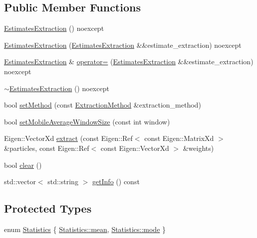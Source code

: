 \subsection*{Public Member Functions}
\begin{DoxyCompactItemize}
\item 
\mbox{\hyperlink{classbfl_1_1EstimatesExtraction_a49ab15a22c1766a16cd6ccc29447dd49}{Estimates\+Extraction}} () noexcept
\item 
\mbox{\hyperlink{classbfl_1_1EstimatesExtraction_a3d16bdd9dbc8841eae07cfdc3aa52114}{Estimates\+Extraction}} (\mbox{\hyperlink{classbfl_1_1EstimatesExtraction}{Estimates\+Extraction}} \&\&estimate\+\_\+extraction) noexcept
\item 
\mbox{\hyperlink{classbfl_1_1EstimatesExtraction}{Estimates\+Extraction}} \& \mbox{\hyperlink{classbfl_1_1EstimatesExtraction_ae473904953c7ad90408da2b4d3c14a1a}{operator=}} (\mbox{\hyperlink{classbfl_1_1EstimatesExtraction}{Estimates\+Extraction}} \&\&estimate\+\_\+extraction) noexcept
\item 
\mbox{\hyperlink{classbfl_1_1EstimatesExtraction_af7a89d920cc8e4ebbef66c1dfce37ecb}{$\sim$\+Estimates\+Extraction}} () noexcept
\item 
bool \mbox{\hyperlink{classbfl_1_1EstimatesExtraction_a68bb4f3b41f578a38d9847b9c140c130}{set\+Method}} (const \mbox{\hyperlink{classbfl_1_1EstimatesExtraction_a8489976af4025f0bbc3288ff7f17ffb0}{Extraction\+Method}} \&extraction\+\_\+method)
\item 
bool \mbox{\hyperlink{classbfl_1_1EstimatesExtraction_a49babb0803c50d697b8d21014010f5bb}{set\+Mobile\+Average\+Window\+Size}} (const int window)
\item 
Eigen\+::\+Vector\+Xd \mbox{\hyperlink{classbfl_1_1EstimatesExtraction_aeb792e7d2e162c13f66903551ff82dfa}{extract}} (const Eigen\+::\+Ref$<$ const Eigen\+::\+Matrix\+Xd $>$ \&particles, const Eigen\+::\+Ref$<$ const Eigen\+::\+Vector\+Xd $>$ \&weights)
\item 
bool \mbox{\hyperlink{classbfl_1_1EstimatesExtraction_a26c432f43ff0849e54b2e9474c02d1a5}{clear}} ()
\item 
std\+::vector$<$ std\+::string $>$ \mbox{\hyperlink{classbfl_1_1EstimatesExtraction_a522ca7407979007a4199291a756486d6}{get\+Info}} () const
\end{DoxyCompactItemize}
\subsection*{Protected Types}
\begin{DoxyCompactItemize}
\item 
enum \mbox{\hyperlink{classbfl_1_1EstimatesExtraction_a8c0593a43166c569530947107c830462}{Statistics}} \{ \mbox{\hyperlink{classbfl_1_1EstimatesExtraction_a8c0593a43166c569530947107c830462ab93db188572fc4d76cce5660f3823b0a}{Statistics\+::mean}}, 
\mbox{\hyperlink{classbfl_1_1EstimatesExtraction_a8c0593a43166c569530947107c830462a15d61712450a686a7f365adf4fef581f}{Statistics\+::mode}}
 \}
\end{DoxyCompactItemize}

